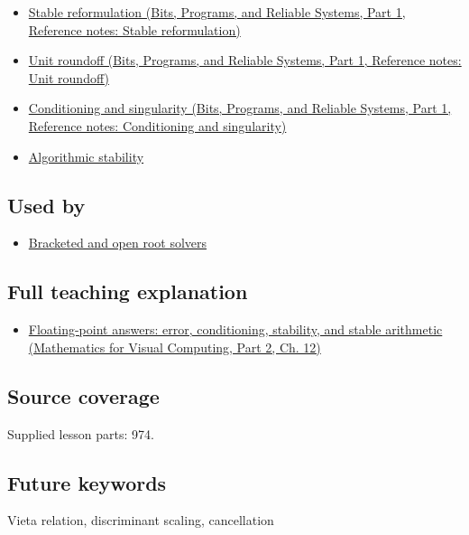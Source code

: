 \begin{itemize}
\tightlist
\item
  \href{../01-Bits-Programs-and-Reliable-Systems-P01/main.pdf\#nameddest=appendix-d7f8ba961670}{Stable reformulation (Bits, Programs, and Reliable Systems, Part 1, Reference notes: Stable reformulation)}
\item
  \href{../01-Bits-Programs-and-Reliable-Systems-P01/main.pdf\#nameddest=appendix-bc44f7b42f42}{Unit roundoff (Bits, Programs, and Reliable Systems, Part 1, Reference notes: Unit roundoff)}
\item
  \href{../01-Bits-Programs-and-Reliable-Systems-P01/main.pdf\#nameddest=appendix-8f6a01f284a7}{Conditioning and singularity (Bits, Programs, and Reliable Systems, Part 1, Reference notes: Conditioning and singularity)}
\item
  \hyperref[appendix-aa2bf0d79639]{Algorithmic stability}
\end{itemize}

\subsection{Used by}\label{appendix-b9afba7f63e5-used-by}

\hypertarget{appendix-b9afba7f63e5-used-by}{}

\begin{itemize}
\tightlist
\item
  \hyperref[appendix-f63eb850796d]{Bracketed and open root solvers}
\end{itemize}

\subsection{Full teaching explanation}\label{appendix-b9afba7f63e5-full-teaching-explanation}

\hypertarget{appendix-b9afba7f63e5-full-teaching-explanation}{}

\begin{itemize}
\tightlist
\item
  \href{../02-Mathematics-for-Visual-Computing-P02/main.pdf\#nameddest=02-foundations-ii-ch028-floating-point-answers-error-conditioning-stability-and-stable-arithmetic}{Floating-point answers: error, conditioning, stability, and stable arithmetic (Mathematics for Visual Computing, Part 2, Ch. 12)}
\end{itemize}

\subsection{Source coverage}\label{appendix-b9afba7f63e5-source-coverage}

\hypertarget{appendix-b9afba7f63e5-source-coverage}{}

Supplied lesson parts: 974.

\subsection{Future keywords}\label{appendix-b9afba7f63e5-future-keywords}

\hypertarget{appendix-b9afba7f63e5-future-keywords}{}

Vieta relation, discriminant scaling, cancellation
